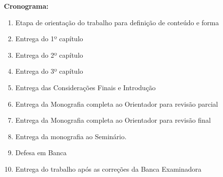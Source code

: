 \documentclass[12pt,a4paper]{article}
\begin{document}
\noindent
\textbf{Cronograma:}
\begin{enumerate}
    \item Etapa de orientação do trabalho para definição de conteúdo e forma
    \item Entrega do 1º capítulo
    \item Entrega do 2º capítulo
    \item Entrega do 3º capítulo
    \item Entrega das Considerações Finais e Introdução
    \item Entrega da Monografia completa ao Orientador para revisão parcial
    \item Entrega da Monografia completa ao Orientador para revisão final
    \item Entrega da monografia ao Seminário.
    \item Defesa em Banca
    \item Entrega do trabalho após as correções da Banca Examinadora
\end{enumerate}


\end{document}
